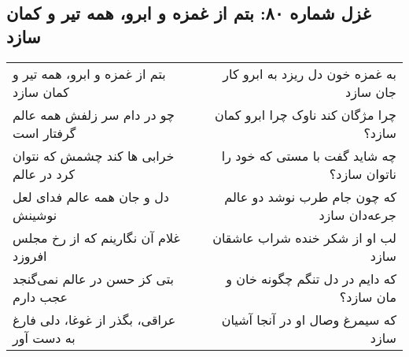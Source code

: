 \begin{center}
\section*{غزل شماره ۸۰: بتم از غمزه و ابرو، همه تیر و کمان سازد}
\label{sec:080}
\begin{longtable}{l p{0.5cm} r}
بتم از غمزه و ابرو، همه تیر و کمان سازد
&&
به غمزه خون دل ریزد به ابرو کار جان سازد
\\
چو در دام سر زلفش همه عالم گرفتار است
&&
چرا مژگان کند ناوک چرا ابرو کمان سازد؟
\\
خرابی ها کند چشمش که نتوان کرد در عالم
&&
چه شاید گفت با مستی که خود را ناتوان سازد؟
\\
دل و جان همه عالم فدای لعل نوشینش
&&
که چون جام طرب نوشد دو عالم جرعه‌دان سازد
\\
غلام آن نگارینم که از رخ مجلس افروزد
&&
لب او از شکر خنده شراب عاشقان سازد
\\
بتی کز حسن در عالم نمی‌گنجد عجب دارم
&&
که دایم در دل تنگم چگونه خان و مان سازد؟
\\
عراقی، بگذر از غوغا، دلی فارغ به دست آور
&&
که سیمرغ وصال او در آنجا آشیان سازد
\\
\end{longtable}
\end{center}
